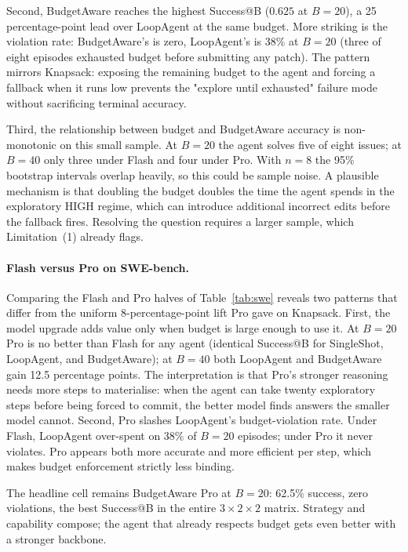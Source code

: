 \documentclass[11pt]{article}
\begin{document}
Second, BudgetAware reaches the highest Success@B ($0.625$ at $B = 20$),
a 25 percentage-point lead over LoopAgent at the same budget. More
striking is the violation rate: BudgetAware's is zero, LoopAgent's is
38\% at $B = 20$ (three of eight episodes exhausted budget before
submitting any patch). The pattern mirrors Knapsack: exposing the
remaining budget to the agent and forcing a fallback when it runs low
prevents the "explore until exhausted" failure mode without
sacrificing terminal accuracy.

Third, the relationship between budget and BudgetAware accuracy is
non-monotonic on this small sample. At $B = 20$ the agent solves five
of eight issues; at $B = 40$ only three under Flash and four under
Pro. With $n = 8$ the 95\% bootstrap intervals overlap heavily, so
this could be sample noise. A plausible mechanism is that doubling
the budget doubles the time the agent spends in the exploratory HIGH
regime, which can introduce additional incorrect edits before the
fallback fires. Resolving the question requires a larger sample,
which Limitation~(1) already flags.

\paragraph{Flash versus Pro on SWE-bench.}
Comparing the Flash and Pro halves of Table~\ref{tab:swe} reveals two
patterns that differ from the uniform 8-percentage-point lift Pro gave
on Knapsack. First, the model upgrade adds value only when budget is
large enough to use it. At $B = 20$ Pro is no better than Flash for
any agent (identical Success@B for SingleShot, LoopAgent, and
BudgetAware); at $B = 40$ both LoopAgent and BudgetAware gain 12.5
percentage points. The interpretation is that Pro's stronger reasoning
needs more steps to materialise: when the agent can take twenty
exploratory steps before being forced to commit, the better model
finds answers the smaller model cannot. Second, Pro slashes
LoopAgent's budget-violation rate. Under Flash, LoopAgent over-spent
on 38\% of $B = 20$ episodes; under Pro it never violates. Pro
appears both more accurate and more efficient per step, which makes
budget enforcement strictly less binding.

The headline cell remains BudgetAware Pro at $B = 20$: 62.5\% success,
zero violations, the best Success@B in the entire $3 \times 2 \times 2$
matrix. Strategy and capability compose; the agent that already
respects budget gets even better with a stronger backbone.
\end{document}

